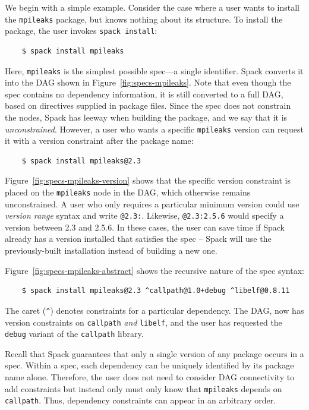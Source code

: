 We begin with a simple example.
Consider the case where a user wants to install the {\tt mpileaks} package, but knows
nothing about its structure.  To install the package, the user invokes {\tt spack install}:
%
\begin{verbatim}
    $ spack install mpileaks
\end{verbatim}
%
Here, {\tt mpileaks} is the simplest possible spec---a single identifier.
Spack converts it into the DAG shown in Figure~\ref{fig:specs-mpileaks}.
Note that even though the spec contains no dependency information, it is still
converted to a full DAG, based on directives supplied in package files. Since 
the spec does not constrain the nodes, Spack has leeway when building the
package, and we say that it is {\it unconstrained}.
%
However, a user who wants a specific {\tt mpileaks} version can 
request it with a version constraint after the package name:
%
\begin{verbatim}
    $ spack install mpileaks@2.3
\end{verbatim}
%
Figure~\ref{fig:specs-mpileaks-version} shows that the specific version 
constraint is placed on the {\tt mpileaks} node in the DAG, which otherwise 
remains unconstrained.
A user who only requires a particular minimum version could use
{\it version range} syntax
and write {\tt @2.3:}.  Likewise, {\tt @2.3:2.5.6} would specify a 
version between 2.3 and 2.5.6. In these cases, the user can save time if
Spack already has a version installed that satisfies the spec -- Spack will use
the previously-built installation instead of building a new one.

Figure~\ref{fig:specs-mpileaks-abstract} shows the recursive nature of the spec syntax:
%
\begin{verbatim}
    $ spack install mpileaks@2.3 ^callpath@1.0+debug ^libelf@0.8.11
\end{verbatim}
%
The caret (\verb|^|) denotes constraints for a particular dependency. The DAG,
now has version constraints on {\tt callpath} {\it and} {\tt libelf},
and the user has requested the {\tt debug} variant of the {\tt callpath} library.

Recall that Spack guarantees that only a single version of any package occurs 
in a spec.  Within a spec, each dependency can be uniquely
identified by its package name alone.  Therefore, the user does not need to consider
DAG connectivity to add constraints but instead only must only know that 
{\tt mpileaks} depends on {\tt callpath}.
Thus, dependency constraints can appear in an arbitrary order.

